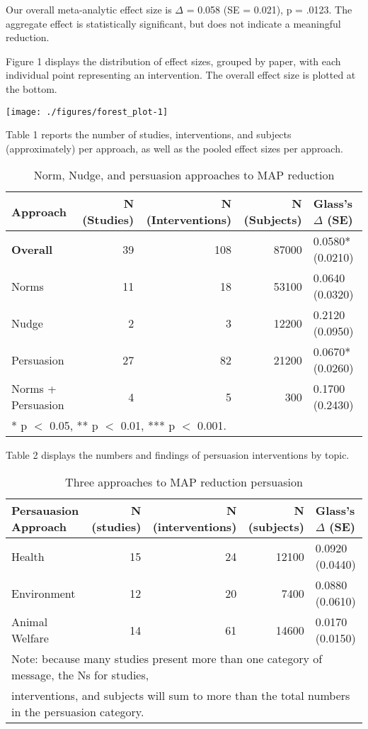 \documentclass[sn-nature,pdflatex]{sn-jnl}
\begin{document}
Our overall meta-analytic effect size is \(\Delta\) = 0.058 (SE =
0.021), p = .0123. The aggregate effect is statistically significant,
but does not indicate a meaningful reduction.

Figure 1 displays the distribution of effect sizes, grouped by paper,
with each individual point representing an intervention. The overall
effect size is plotted at the bottom.

\texttt{[image: ./figures/forest\_plot-1]}

Table 1 reports the number of studies, interventions, and subjects
(approximately) per approach, as well as the pooled effect sizes per
approach.

\begin{table}[!h]
\centering
\caption{\label{tab:table_one}Norm, Nudge, and persuasion approaches to MAP reduction}
\centering
\begin{tabular}[t]{lrrrl}
\toprule
Approach & N (Studies) & N (Interventions) & N (Subjects) & Glass's $\Delta$ (SE)\\
\midrule
\textbf{Overall} & 39 & 108 & 87000 & 0.0580* (0.0210)\\
Norms & 11 & 18 & 53100 & 0.0640 (0.0320)\\
Nudge & 2 & 3 & 12200 & 0.2120 (0.0950)\\
Persuasion & 27 & 82 & 21200 & 0.0670* (0.0260)\\
Norms + Persuasion & 4 & 5 & 300 & 0.1700 (0.2430)\\
\bottomrule
\multicolumn{5}{l}{\rule{0pt}{1em}* p $<$ 0.05, ** p $<$ 0.01, *** p $<$ 0.001.}\\
\end{tabular}
\end{table}

Table 2 displays the numbers and findings of persuasion interventions by
topic.

\begin{table}[!h]
\centering
\caption{\label{tab:table_two}Three approaches to MAP reduction persuasion}
\centering
\begin{tabular}[t]{lrrrl}
\toprule
Persauasion Approach & N (studies) & N (interventions) & N (subjects) & Glass's $\Delta$ (SE)\\
\midrule
Health & 15 & 24 & 12100 & 0.0920 (0.0440)\\
Environment & 12 & 20 & 7400 & 0.0880 (0.0610)\\
Animal Welfare & 14 & 61 & 14600 & 0.0170 (0.0150)\\
\bottomrule
\multicolumn{5}{l}{\textsuperscript{} Note: because many studies present more than one category of message, the Ns for studies, \linebreak}\\
\multicolumn{5}{l}{interventions, and subjects will sum to more than the total numbers in the persuasion category.}\\
\end{tabular}
\end{table}
\end{document}
